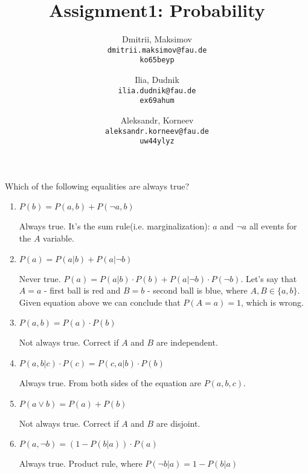 \documentclass{homework}
\title{Assignment1: Probability}
\author{
  Dmitrii, Maksimov\\
  \texttt{dmitrii.maksimov@fau.de} \\
  \texttt{ko65beyp}
  \and
  Ilia, Dudnik\\
  \texttt{ilia.dudnik@fau.de}\\
  \texttt{ex69ahum}
  \and
  Aleksandr, Korneev\\
  \texttt{aleksandr.korneev@fau.de}\\
  \texttt{uw44ylyz}
}
\begin{document}
\maketitle

Which of the following equalities are always true?
\begin{enumerate}
	\item $P(b)=P(a,b)+P(\lnot a, b)$
	
	Always true.  It's the sum rule(i.e. marginalization): $a$ and $\lnot a$ all events for the $A$ variable.
	\item $P(a) = P(a|b) + P(a|\lnot b)$
	
	Never true.  $P(a) = P(a|b)\cdot P(b) + P(a|\lnot b)\cdot P(\lnot b)$.  
	\newline Let's say that $A=a$ - first ball is red and $B=b$ - second ball is blue, where $A,B\in \{a,b\}$. Given equation above we can conclude that $P(A=a) = 1$, which is wrong.
	\item $P(a,b)=P(a)\cdot P(b)$
	
	Not always true. Correct if $A$ and $B$ are independent.
	\item $P(a,b|c)\cdot P(c)=P(c,a|b)\cdot P(b)$
	
	Always true.  From both sides of the equation are $P(a,b,c)$.
	\item $P(a\lor b)=P(a)+P(b)$

	Not always true. Correct if $A$ and $B$ are disjoint.
	\item $P(a,\lnot b)=(1-P(b|a))\cdot P(a)$

	Always true. Product rule, where $P(\lnot b|a)=1-P(b|a)$
\end{enumerate}
\end{document}
